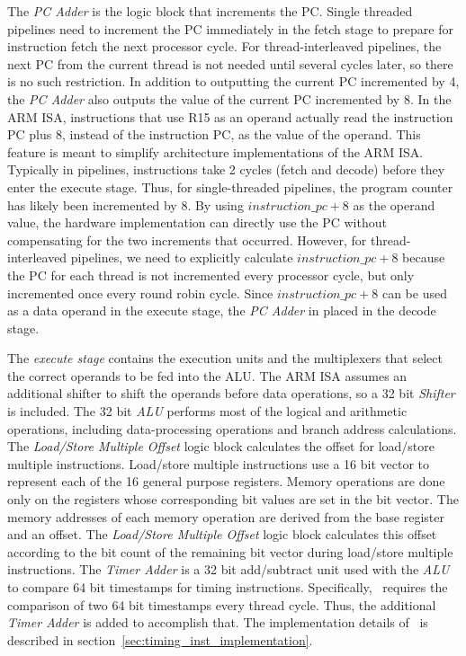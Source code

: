 The \emph{PC Adder} is the logic block that increments the PC. 
Single threaded pipelines need to increment the PC immediately in the fetch stage to prepare for instruction fetch the next processor cycle.  
For thread-interleaved pipelines, the next PC from the current thread is not needed until several cycles later, so there is no such restriction.
In addition to outputting the current PC incremented by 4, the \emph{PC Adder} also outputs the value of the current PC incremented by 8.
In the ARM ISA, instructions that use R15 as an operand actually read the instruction PC plus 8, instead of the instruction PC, as the value of the operand.
This feature is meant to simplify architecture implementations of the ARM ISA.  
Typically in pipelines, instructions take 2 cycles (fetch and decode) before they enter the execute stage. 
Thus, for single-threaded pipelines, the program counter has likely been incremented by 8.
By using $instruction\_pc+8$ as the operand value, the hardware implementation can directly use the PC without compensating for the two increments that occurred. 
However, for thread-interleaved pipelines, we need to explicitly calculate $instruction\_pc+8$ because the PC for each thread is not incremented every processor cycle, but only incremented once every round robin cycle.
Since $instruction\_pc+8$ can be used as a data operand in the execute stage, the \emph{PC Adder} in placed in the decode stage.  

The \emph{execute stage} contains the execution units and the multiplexers that select the correct operands to be fed into the ALU.  
The ARM ISA assumes an additional shifter to shift the operands before data operations, so a 32 bit \emph{Shifter} is included.
The 32 bit \emph{ALU} performs most of the logical and arithmetic operations, including data-processing operations and branch address calculations.
The \emph{Load/Store Multiple Offset} logic block calculates the offset for load/store multiple instructions.
Load/store multiple instructions use a 16 bit vector to represent each of the 16 general purpose registers.
Memory operations are done only on the registers whose corresponding bit values are set in the bit vector.
The memory addresses of each memory operation are derived from the base register and an offset. 
The \emph{Load/Store Multiple Offset} logic block calculates this offset according to the bit count of the remaining bit vector during load/store multiple instructions.
The \emph{Timer Adder} is a 32 bit add/subtract unit used with the \emph{ALU} to compare 64 bit timestamps for timing instructions. 
Specifically, \delayuntil\ requires the comparison of two 64 bit timestamps every thread cycle.
Thus, the additional \emph{Timer Adder} is added to accomplish that.  
The implementation details of \delayuntil\ is described in section~\ref{sec:timing_inst_implementation}.

